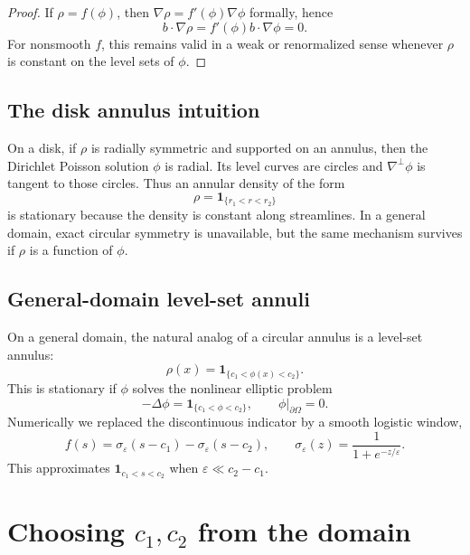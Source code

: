 \documentclass[11pt,a4paper]{article}
\newcommand{\Om}{\Omega}
\newcommand{\eps}{\varepsilon}
\begin{document}
\begin{proof}
If $\rho=f(\phi)$, then $\nabla\rho=f'(\phi)\nabla\phi$ formally, hence
\begin{equation}
  b\cdot\nabla\rho=f'(\phi)b\cdot\nabla\phi=0.
\end{equation}
For nonsmooth $f$, this remains valid in a weak or renormalized sense whenever $\rho$ is constant on the level sets of $\phi$.
\end{proof}

\subsection{The disk annulus intuition}

On a disk, if $\rho$ is radially symmetric and supported on an annulus, then the Dirichlet Poisson solution $\phi$ is radial. Its level curves are circles and $\nabla^\perp\phi$ is tangent to those circles. Thus an annular density of the form
\begin{equation}
  \rho = \mathbf{1}_{\{r_1<r<r_2\}}
\end{equation}
is stationary because the density is constant along streamlines. In a general domain, exact circular symmetry is unavailable, but the same mechanism survives if $\rho$ is a function of $\phi$.

\subsection{General-domain level-set annuli}

On a general domain, the natural analog of a circular annulus is a level-set annulus:
\begin{equation}
  \rho(x)=\mathbf{1}_{\{c_1<\phi(x)<c_2\}}.
\end{equation}
This is stationary if $\phi$ solves the nonlinear elliptic problem
\begin{equation}
  -\Delta\phi=\mathbf{1}_{\{c_1<\phi<c_2\}},
  \qquad \phi|_{\partial\Om}=0.
\end{equation}
Numerically we replaced the discontinuous indicator by a smooth logistic window,
\begin{equation}
  f(s)=\sigma_\eps(s-c_1)-\sigma_\eps(s-c_2),
  \qquad
  \sigma_\eps(z)=\frac{1}{1+e^{-z/\eps}}.
\end{equation}
This approximates $\mathbf{1}_{c_1<s<c_2}$ when $\eps\ll c_2-c_1$.

\section{Choosing $c_1,c_2$ from the domain}
\end{document}
